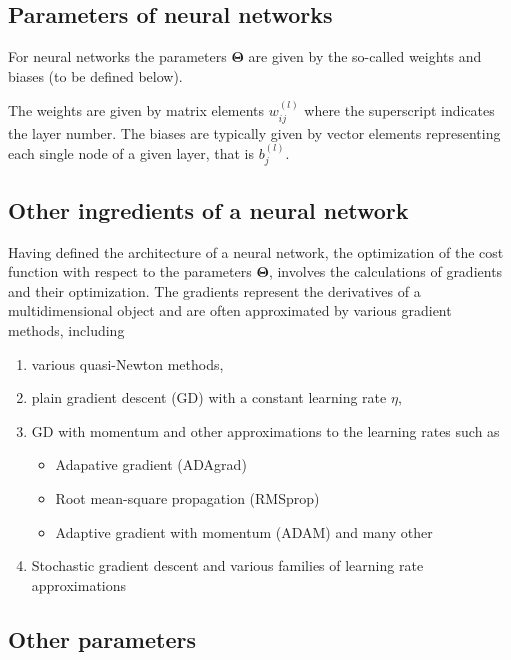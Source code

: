 \documentclass[%
oneside,                 %
final,                   %
10pt]{article}
\begin{document}
\subsection{Parameters of neural networks}
For neural networks the parameters
$\bm{\Theta}$ are given by the so-called weights and biases (to be
defined below).

The weights are given by matrix elements $w_{ij}^{(l)}$ where the
superscript indicates the layer number. The biases are typically given
by vector elements representing each single node of a given layer,
that is $b_j^{(l)}$.

\subsection{Other ingredients of a neural network}

Having defined the architecture of a neural network, the optimization
of the cost function with respect to the parameters $\bm{\Theta}$,
involves the calculations of gradients and their optimization. The
gradients represent the derivatives of a multidimensional object and
are often approximated by various gradient methods, including
\begin{enumerate}
\item various quasi-Newton methods,

\item plain gradient descent (GD) with a constant learning rate $\eta$,

\item GD with momentum and other approximations to the learning rates such as
\begin{itemize}

  \item Adapative gradient (ADAgrad)

  \item Root mean-square propagation (RMSprop)

  \item Adaptive gradient with momentum (ADAM) and many other

\end{itemize}

\noindent
\item Stochastic gradient descent and various families of learning rate approximations
\end{enumerate}

\noindent
\subsection{Other parameters}
\end{document}
